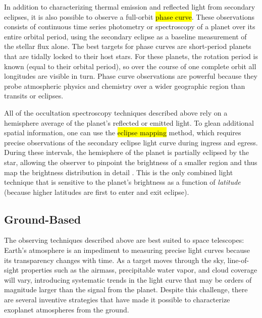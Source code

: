 \documentclass[graybox,natbib,nosecnum]{svmult}
\newcommand{\hbindex}[1]{\hl{#1}\index{#1}}  %
\begin{document}
In addition to characterizing thermal emission and reflected light from secondary eclipses, it is also possible to observe a full-orbit \hbindex{phase curve}. These observations consists of continuous time series photometry or spectroscopy of a planet over its entire orbital period, using the secondary eclipse as a baseline measurement of the stellar flux alone.  The best targets for phase curves are short-period planets that are tidally locked to their host stars. For these planets, the rotation period is known (equal to their orbital period), so over the course of one complete orbit all longitudes are visible in turn.  Phase curve observations are powerful because they probe atmospheric physics and chemistry over a wider geographic region than transits or eclipses. %

All of the occultation spectroscopy techniques described above rely on a hemisphere average of the planet's reflected or emitted light. To glean additional spatial information, one can use the \hbindex{eclipse mapping} method, which requires precise observations of the secondary eclipse light curve during ingress and egress.  During these intervals, the hemisphere of the planet is partially eclipsed by the star, allowing the observer to pinpoint the brightness of a smaller region and thus map the brightness distribution in detail \citep{rauscher07}.  This is the only combined light technique that is sensitive to the planet's brightness as a function of \emph{latitude} (because higher latitudes are first to enter and exit eclipse).

\subsection{Ground-Based}
The observing techniques described above are best suited to space telescopes: Earth's atmosphere is an impediment to measuring precise light curves because its transparency changes with time.  As a target moves through the sky, line-of-sight properties such as the airmass, precipitable water vapor, and cloud coverage will vary, introducing systematic trends in the light curve that may be orders of magnitude larger than the signal from the planet. Despite this challenge, there are several inventive strategies that have made it possible to characterize exoplanet atmospheres from the ground. 
\end{document}
